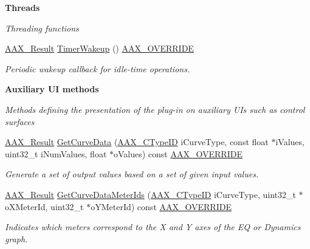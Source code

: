 \begin{Indent}\textbf{ Threads}\par
{\em Threading functions }\begin{DoxyCompactItemize}
\item 
\mbox{\hyperlink{a00392_a4d8f69a697df7f70c3a8e9b8ee130d2f}{A\+A\+X\+\_\+\+Result}} \mbox{\hyperlink{a01481_a4e1dc0e4b966fe80041d67814d13e03d}{Timer\+Wakeup}} () \mbox{\hyperlink{a00392_ac2f24a5172689ae684344abdcce55463}{A\+A\+X\+\_\+\+O\+V\+E\+R\+R\+I\+DE}}
\begin{DoxyCompactList}\small\item\em Periodic wakeup callback for idle-\/time operations. \end{DoxyCompactList}\end{DoxyCompactItemize}
\end{Indent}
\begin{Indent}\textbf{ Auxiliary UI methods}\par
{\em Methods defining the presentation of the plug-\/in on auxiliary U\+Is such as control surfaces }\begin{DoxyCompactItemize}
\item 
\mbox{\hyperlink{a00392_a4d8f69a697df7f70c3a8e9b8ee130d2f}{A\+A\+X\+\_\+\+Result}} \mbox{\hyperlink{a01481_a258910d59fee409213caa04e51ee68cf}{Get\+Curve\+Data}} (\mbox{\hyperlink{a00392_ac678f9c1fbcc26315d209f71a147a175}{A\+A\+X\+\_\+\+C\+Type\+ID}} i\+Curve\+Type, const float $\ast$i\+Values, uint32\+\_\+t i\+Num\+Values, float $\ast$o\+Values) const \mbox{\hyperlink{a00392_ac2f24a5172689ae684344abdcce55463}{A\+A\+X\+\_\+\+O\+V\+E\+R\+R\+I\+DE}}
\begin{DoxyCompactList}\small\item\em Generate a set of output values based on a set of given input values. \end{DoxyCompactList}\item 
\mbox{\hyperlink{a00392_a4d8f69a697df7f70c3a8e9b8ee130d2f}{A\+A\+X\+\_\+\+Result}} \mbox{\hyperlink{a01481_af9cd663956c0d903bbf0df349354e573}{Get\+Curve\+Data\+Meter\+Ids}} (\mbox{\hyperlink{a00392_ac678f9c1fbcc26315d209f71a147a175}{A\+A\+X\+\_\+\+C\+Type\+ID}} i\+Curve\+Type, uint32\+\_\+t $\ast$o\+X\+Meter\+Id, uint32\+\_\+t $\ast$o\+Y\+Meter\+Id) const \mbox{\hyperlink{a00392_ac2f24a5172689ae684344abdcce55463}{A\+A\+X\+\_\+\+O\+V\+E\+R\+R\+I\+DE}}
\begin{DoxyCompactList}\small\item\em Indicates which meters correspond to the X and Y axes of the EQ or Dynamics graph. \end{DoxyCompactList}\item 

\end{DoxyCompactItemize}
\end{Indent}
